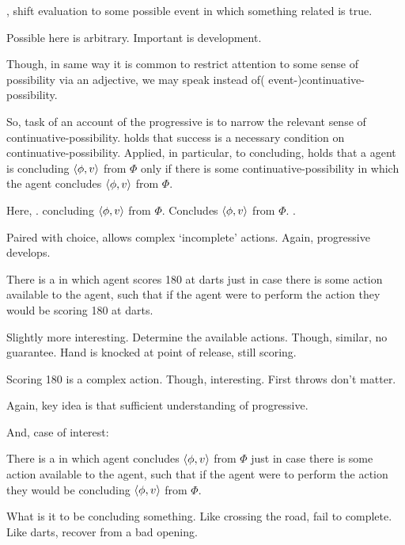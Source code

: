 \begin{note}
  , shift evaluation to some possible event in which something related is true.

  Possible here is arbitrary.
  Important is development.

  Though, in same way it is common to restrict attention to some sense of possibility via an adjective, we may speak instead of( event-)continuative-possibility.

  So, task of an account of the progressive is to narrow the relevant sense of continuative-possibility.
   holds that success is a necessary condition on continuative-possibility.
  Applied, in particular, to concluding,  holds that a agent is concluding \(\langle \phi, v \rangle\) from \(\Phi\) only if there is some continuative-possibility in which the agent concludes \(\langle \phi, v \rangle\) from \(\Phi\).

  Here, \fc{}.
  concluding \(\langle \phi, v \rangle\) from \(\Phi\).
  Concludes \(\langle \phi, v \rangle\) from \(\Phi\).
  .
\end{note}

\begin{note}
  Paired with choice, allows complex `incomplete' actions.
  Again, progressive develops.

  \begin{illustration}[Darts]
    There is a \pevent{} in which agent scores 180 at darts just in case there is some action available to the agent, such that if the agent were to perform the action they would be scoring 180 at darts.
  \end{illustration}

  Slightly more interesting.
  Determine the available actions.
  Though, similar, no guarantee.
  Hand is knocked at point of release, still scoring.

  Scoring 180 is a complex action.
  Though, interesting.
  First throws don't matter.

  Again, key idea is that sufficient understanding of progressive.

  And, case of interest:

  \begin{illustration}[Concluding]
    There is a \pevent{} in which agent concludes \(\langle \phi, v \rangle\) from \(\Phi\) just in case there is some action available to the agent, such that if the agent were to perform the action they would be concluding \(\langle \phi, v \rangle\) from \(\Phi\).
  \end{illustration}

  What is it to be concluding something.
  Like crossing the road, fail to complete.
  Like darts, recover from a bad opening.
\end{note}

